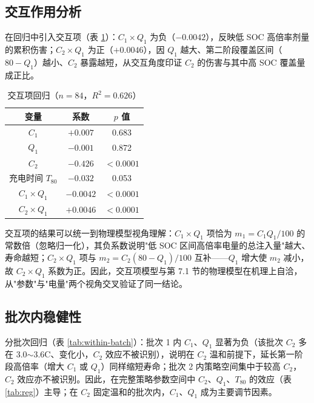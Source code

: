 \documentclass[withoutpreface]{cumcmthesis}
\begin{document}
\subsection{交互作用分析}

在回归中引入交互项（表 \ref{tab:interact}）：$C_1\times Q_1$ 为负（$-0.0042$），反映低 SOC 高倍率剂量的累积伤害；$C_2\times Q_1$ 为正（$+0.0046$），因 $Q_1$ 越大、第二阶段覆盖区间（$80-Q_1$）越小、$C_2$ 暴露越短，从交互角度印证 $C_2$ 的伤害与其中高 SOC 覆盖量成正比。

\begin{table}[htbp]
\centering
\caption{交互项回归（$n=84$，$R^2=0.626$）}
\label{tab:interact}
\begin{tabular}{ccc}
\toprule
变量 & 系数 & $p$ 值 \\
\midrule
$C_1$ & $+0.007$ & 0.683 \\
$Q_1$ & $-0.001$ & 0.872 \\
$C_2$ & $-0.426$ & $<0.0001$ \\
充电时间 $T_{80}$ & $-0.032$ & 0.053 \\
$C_1\times Q_1$ & $-0.0042$ & $<0.0001$ \\
$C_2\times Q_1$ & $+0.0046$ & $<0.0001$ \\
\bottomrule
\end{tabular}
\end{table}

交互项的结果可以统一到物理模型视角理解：$C_1\times Q_1$ 项恰为 $m_1=C_1Q_1/100$ 的常数倍（忽略归一化），其负系数说明"低 SOC 区间高倍率电量的总注入量"越大、寿命越短；$C_2\times Q_1$ 项与 $m_2=C_2(80-Q_1)/100$ 互补——$Q_1$ 增大使 $m_2$ 减小，故 $C_2\times Q_1$ 系数为正。因此，交互项模型与第 7.1 节的物理模型在机理上自洽，从"参数"与"电量"两个视角交叉验证了同一结论。

\iffalse

\subsection{批次内稳健性}

分批次回归（表 \ref{tab:within-batch}）：批次 1 内 $C_1$、$Q_1$ 显著为负（该批次 $C_2$ 多在 3.0$\sim$3.6C、变化小，$C_2$ 效应不被识别），说明在 $C_2$ 温和前提下，延长第一阶段高倍率（增大 $C_1$ 或 $Q_1$）同样缩短寿命；批次 2 内策略空间集中于较高 $C_2$，$C_2$ 效应亦不被识别。因此，在完整策略参数空间中 $C_2$、$Q_1$、$T_{80}$ 的效应（表 \ref{tab:reg}）主导；在 $C_2$ 固定温和的批次内，$C_1$、$Q_1$ 成为主要调节因素。
\end{document}
